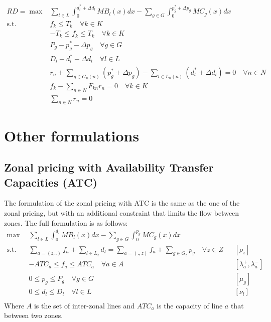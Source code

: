 \documentclass[12pt, openany]{report}
\theoremstyle{definition}
\begin{document}
\begin{equation}
    \begin{aligned}
        RD = \max & \sum_{l \in L} \int_{0}^{d_l^* + \Delta d_l} MB_l(x)dx - \sum_{g \in G} \int_{0}^{p_g^* + \Delta p_g} MC_g(x)dx \\
        \text{s.t.} \quad & f_k \leq T_k \quad \forall k \in K \\
        & -T_k \leq f_k \leq T_k \quad \forall k \in K \\
        & P_g - p_g^* - \Delta p_g \quad \forall g \in G \\
        & D_l - d_l^* - \Delta d_l \quad \forall l \in L \\
        & r_n + \sum_{g \in G_n(n)} (p_g^* + \Delta p_g) - \sum_{l \in L_n(n)} (d_l^* + \Delta d_l) = 0 \quad \forall n \in N \\
        & f_k - \sum_{n \in N} F_{kn} r_n = 0 \quad \forall k \in K \\
        & \sum_{n \in N} r_n = 0
    \end{aligned}
\end{equation}
\section{Other formulations}
\subsection{Zonal pricing with Availability Transfer Capacities (ATC)}
The formulation of the zonal pricing with ATC is the same as the one of the zonal pricing, but with an additional constraint that limits the flow between zones. The full formulation is as follows:
\begin{equation}
    \begin{aligned}
        \max & \sum_{l \in L}  \int_{0}^{d_l} MB_l(x)dx - \sum_{g \in G} \int_{0}^{p_g} MC_g(x)dx &&\\
        \text{s.t.} \quad & \sum_{a=(z,.)} f_a + \sum_{l \in L_z} d_l = \sum_{a=(.,z)} f_a + \sum_{g \in G_z} p_g \quad \forall z \in Z  && [\rho_z] \\
        & -ATC_a \leq f_a \leq ATC_a \quad \forall a \in A  && [\lambda_a^+, \lambda_a^-] \\
        & 0 \leq p_g \leq P_g \quad \forall g \in G  && [\mu_g] \\
        & 0 \leq d_l \leq D_l \quad \forall l \in L  && [\nu_l] \\
    \end{aligned}
\end{equation}
Where $A$ is the set of inter-zonal lines and $ATC_a$ is the capacity of line $a$ that between two zones. 
\end{document}
